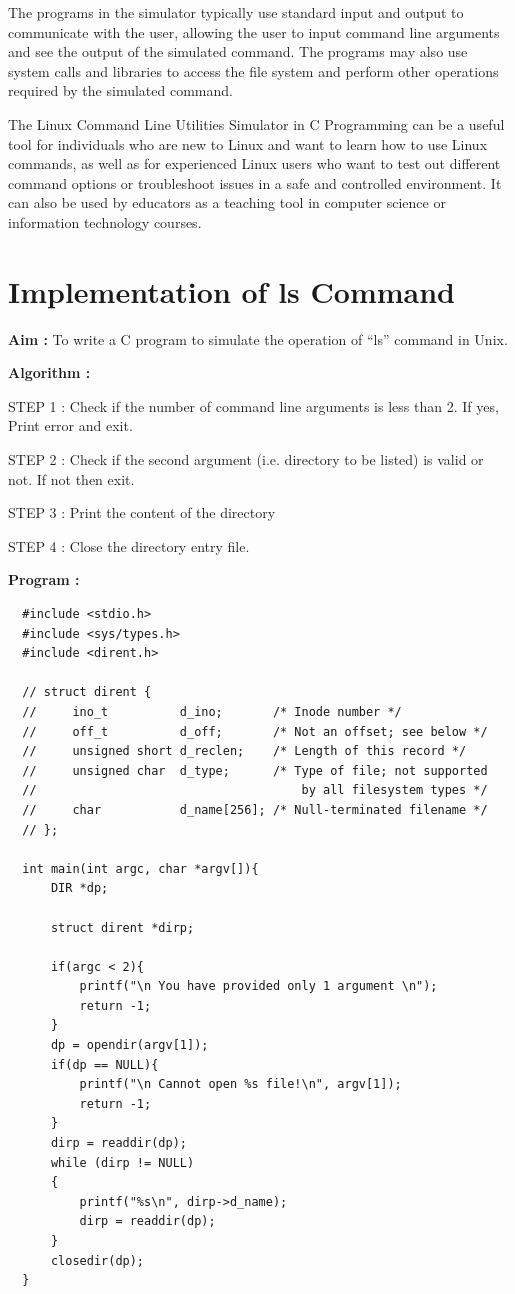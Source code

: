 \documentclass[journal,onecolumn]{IEEEtran}
\begin{document}
The programs in the simulator typically use standard input and output to communicate with the user, allowing the user to input command line arguments and see the output of the simulated command. The programs may also use system calls and libraries to access the file system and perform other operations required by the simulated command.

The Linux Command Line Utilities Simulator in C Programming can be a useful tool for individuals who are new to Linux and want to learn how to use Linux commands, as well as for experienced Linux users who want to test out different command options or troubleshoot issues in a safe and controlled environment. It can also be used by educators as a teaching tool in computer science or information technology courses.

\section{Implementation of ls Command}
\textbf{Aim : } To write a C program to simulate the operation of “ls” command in Unix.

\textbf{Algorithm : }
\begin{list}{}{}
  \item STEP 1 : Check if the number of command line arguments is less than 2. If
  yes, Print error and exit.
  \item STEP 2 : Check if the second argument (i.e. directory to be listed) is valid or not. If not
  then exit.
  \item STEP 3 : Print the content of the directory
  \item STEP 4 : Close the directory entry file.
\end{list}

\textbf{Program : }
\begin{verbatim}
  #include <stdio.h>
  #include <sys/types.h>
  #include <dirent.h>
  
  // struct dirent {
  //     ino_t          d_ino;       /* Inode number */
  //     off_t          d_off;       /* Not an offset; see below */
  //     unsigned short d_reclen;    /* Length of this record */
  //     unsigned char  d_type;      /* Type of file; not supported
  //                                     by all filesystem types */
  //     char           d_name[256]; /* Null-terminated filename */
  // };
  
  int main(int argc, char *argv[]){
      DIR *dp;
  
      struct dirent *dirp;
  
      if(argc < 2){
          printf("\n You have provided only 1 argument \n");
          return -1;
      }
      dp = opendir(argv[1]);
      if(dp == NULL){
          printf("\n Cannot open %s file!\n", argv[1]);
          return -1;
      }
      dirp = readdir(dp);
      while (dirp != NULL)
      {
          printf("%s\n", dirp->d_name);
          dirp = readdir(dp);
      }
      closedir(dp);
  }
\end{verbatim}
\end{document}
